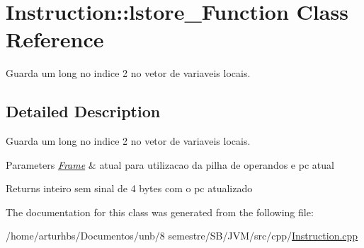 \hypertarget{classInstruction_1_1lstore__2Function}{}\section{Instruction\+:\+:lstore\+\_\+Function Class Reference}
\label{classInstruction_1_1lstore__2Function}


Guarda um long no indice 2 no vetor de variaveis locais.  




\subsection{Detailed Description}
Guarda um long no indice 2 no vetor de variaveis locais. 


\begin{DoxyParams}{Parameters}
{\em \hyperlink{classFrame}{Frame}} & atual para utilizacao da pilha de operandos e pc atual \\
\hline
\end{DoxyParams}
\begin{DoxyReturn}{Returns}
inteiro sem sinal de 4 bytes com o pc atualizado 
\end{DoxyReturn}


The documentation for this class was generated from the following file\+:\begin{DoxyCompactItemize}
\item 
/home/arturhbs/\+Documentos/unb/8 semestre/\+S\+B/\+J\+V\+M/src/cpp/\hyperlink{Instruction_8cpp}{Instruction.\+cpp}\end{DoxyCompactItemize}
